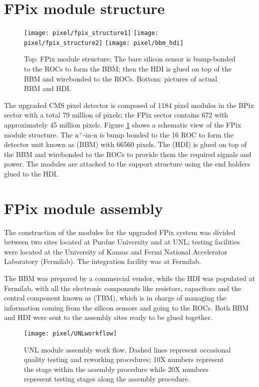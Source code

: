 \section{FPix module structure}

\begin{figure}[!h]
  \centering
  \texttt{[image: pixel/fpix\_structure1]}
  \texttt{[image: pixel/fpix\_structure2]}
  \texttt{[image: pixel/bbm\_hdi]}
  \caption[FPix module structure.]{Top: FPix module structure; The bare silicon sensor is bump-bonded to the ROCs to form the BBM; then the HDI is glued on top of the BBM and wirebonded to the ROCs. Bottom: pictures of actual BBM and HDI.}\label{fig:fpix_struc}
\end{figure}

The upgraded CMS pixel detector is composed of 1184 pixel modules in the BPix sector with a total 79 million of pixels; the FPix sector contains 672 with approximately 45 million pixels. Figure \ref{fig:fpix_struc} shows a schematic view of the FPix module structure. The n$^{+}$-in-n  is bump bonded to the 16 ROC to form the detector unit known as  (BBM) with 66560 pixels. The  (HDI) is glued on top of the BBM and wirebonded to the ROCs to provide them the required signals and power. The modules are attached to the support structure using the end holders glued to the HDI.

\section{FPix module assembly}

The construction of the modules for the upgraded FPix system was divided between two sites located at Purdue University and at UNL; testing facilities were located at the University of Kansas and Fermi National Accelerator Laboratory (Fermilab). The integration facility was at Fermilab. 

The BBM was prepared by a commercial vendor, while the HDI was populated at Fermilab, with all the electronic components like resistors, capacitors and the central component known as  (TBM), which is in charge of managing the information coming from the silicon sensors and going to the ROCs. Both BBM and HDI were sent to the assembly sites ready to be glued together.  


\begin{figure}[!h]
  \centering
  \texttt{[image: pixel/UNLworkflow]}
  \caption[UNL module assembly work flow.]{UNL module assembly work flow. Dashed lines represent occasional quality testing and reworking procedures; 10X numbers represent the stage within the assembly procedure while 20X numbers represent testing stages along the assembly procedure.}\label{fig:unlworkflow}
\end{figure}


